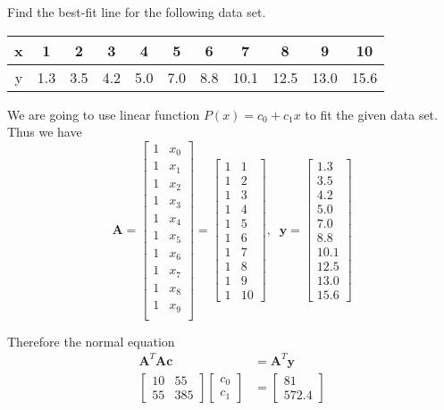 \begin{ex}
	Find the best-fit line for the following data set.
	
	
	\begin{tabular}{|c|c|c|c|c|c|c|c|c|c|c|}
		\hline 
		x & 1 & 2 & 3 & 4 & 5 & 6 & 7 & 8 & 9 & 10 \\ 
		\hline 
		y & 1.3 & 3.5 & 4.2 & 5.0 & 7.0 & 8.8 & 10.1 & 12.5 & 13.0 & 15.6 \\ 
		\hline 
	\end{tabular} 
\end{ex}
\begin{solution}
	We are going to use linear function $ P(x) = c_0 + c_1x$ to fit the given data set. Thus we have
	\[ \mathbf{A} 
	= \begin{bmatrix}
	1 & x_0\\ 1 & x_1\\ 1 & x_2\\ 1& x_3\\ 1 & x_4\\ 1 & x_5\\ 1 & x_6\\ 1 & x_7\\ 1 & x_8\\ 1 & x_9\\
	\end{bmatrix}
	= \begin{bmatrix}
	1& 1\\ 1& 2\\ 1& 3\\ 1& 4\\ 1& 5\\ 1& 6\\ 1& 7\\ 1& 8\\ 1& 9\\ 1& 10
	\end{bmatrix},\;\;
	\mathbf{y} = \begin{bmatrix}
	1.3 \\ 3.5 \\ 4.2 \\ 5.0 \\ 7.0 \\ 8.8 \\ 10.1 \\ 12.5 \\ 13.0 \\ 15.6
	\end{bmatrix} \]
	
	Therefore the normal equation 
	\begin{align*}
	\mathbf{A}^T \mathbf{Ac} &= \mathbf{A}^T \mathbf{y}\\
	\begin{bmatrix}
	10 & 55\\ 55 & 385
	\end{bmatrix}
	\begin{bmatrix}
	c_0\\ c_1
	\end{bmatrix}
	&= \begin{bmatrix}
	81\\ 572.4
	\end{bmatrix}
	\end{align*}
	

\end{solution}

